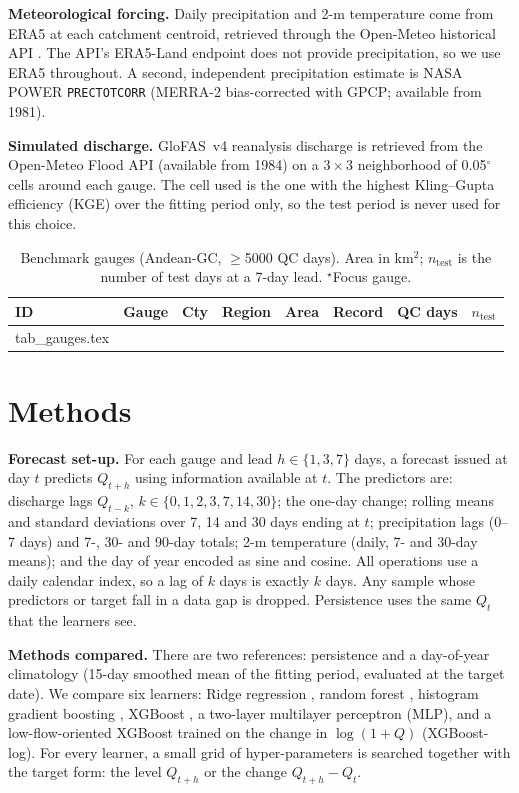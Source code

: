 \documentclass[graybox]{svmult}
\makeatletter
\newcommand{\inputtable}[1]{\@@input #1 }%
\makeatother
\begin{document}
\textbf{Meteorological forcing.} Daily precipitation and 2-m temperature come from ERA5 \cite{hersbach2020era5} at each catchment centroid, retrieved through the Open-Meteo historical API \cite{openmeteo}. The API's ERA5-Land endpoint \cite{munozsabater2021era5land} does not provide precipitation, so we use ERA5 throughout. A second, independent precipitation estimate is NASA POWER \texttt{PRECTOTCORR} (MERRA-2 bias-corrected with GPCP; available from 1981).

\textbf{Simulated discharge.} GloFAS~v4 reanalysis discharge is retrieved from the Open-Meteo Flood API (available from 1984) on a $3\times3$ neighborhood of 0.05$^\circ$ cells around each gauge. The cell used is the one with the highest Kling--Gupta efficiency (KGE) over the fitting period only, so the test period is never used for this choice.



\begin{table}[!htb]
\centering
\caption{Benchmark gauges (Andean-GC, $\ge$5000 QC days). Area in km$^2$; $n_{\mathrm{test}}$ is the number of test days at a 7-day lead. $^\star$Focus gauge.}
\label{tab:gauges}
\scriptsize
\setlength{\tabcolsep}{3pt}
\begin{tabular}{llllrlrr}
\toprule
ID & Gauge & Cty & Region & Area & Record & QC days & $n_{\mathrm{test}}$ \\
\midrule
\inputtable{tab_gauges.tex}
\bottomrule
\end{tabular}
\end{table}

\section{Methods}
\label{sec:methods}

\textbf{Forecast set-up.} For each gauge and lead $h\in\{1,3,7\}$ days, a forecast issued at day $t$ predicts $Q_{t+h}$ using information available at $t$. The \nFeatures{} predictors are: discharge lags $Q_{t-k}$, $k\in\{0,1,2,3,7,14,30\}$; the one-day change; rolling means and standard deviations over 7, 14 and 30 days ending at $t$; precipitation lags (0--7 days) and 7-, 30- and 90-day totals; 2-m temperature (daily, 7- and 30-day means); and the day of year encoded as sine and cosine. All operations use a daily calendar index, so a lag of $k$ days is exactly $k$ days. Any sample whose predictors or target fall in a data gap is dropped. Persistence uses the same $Q_t$ that the learners see.

\textbf{Methods compared.} There are two references: persistence and a day-of-year climatology (15-day smoothed mean of the fitting period, evaluated at the target date). We compare six learners: Ridge regression \cite{hoerl1970ridge}, random forest \cite{breiman2001rf}, histogram gradient boosting \cite{friedman2001gbm}, XGBoost \cite{chen2016xgboost}, a two-layer multilayer perceptron (MLP), and a low-flow-oriented XGBoost trained on the change in $\log(1+Q)$ (XGBoost-log). For every learner, a small grid of hyper-parameters is searched together with the target form: the level $Q_{t+h}$ or the change $Q_{t+h}-Q_t$.
\end{document}
